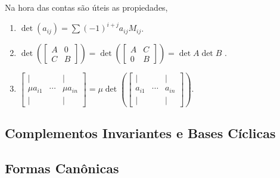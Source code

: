 \begin{note}
    Na hora das contas são úteis as propiedades,
    \begin{enumerate}[label = \roman*.]
        \item \(\det (a_{ij}) = \sum (-1)^{i+j} a_{ij} M_{ij}\). 
        \item  {\small\( \det \left(\begin{bmatrix}
            A & 0 \\ 
            C & B
        \end{bmatrix}\right) = \det \left(\begin{bmatrix}
            A & C \\ 
            0 & B
        \end{bmatrix}\right) = \det A \det B\) }.  
        \item {\small \(\begin{bmatrix}
        | &  & | \\ 
        \mu a_{i1} & \cdots & \mu a_{in}\\
        | &  & |
        \end{bmatrix} = \mu \det \left(\begin{bmatrix}
        | &  & | \\ 
        a_{i1} & \cdots & a_{in}\\
        | &  & |
        \end{bmatrix}\right)\)}. 
    \end{enumerate}
\end{note}

\subsection{Complementos Invariantes e Bases Cíclicas}

\subsection{Formas Canônicas}

